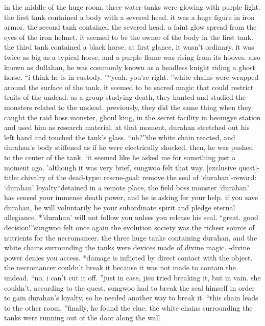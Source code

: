  in the middle of the huge room, three water tanks were glowing with purple light.
the first tank contained a body with a severed head.
 it was a huge figure in iron armor.
the second tank contained the severed head.
 a faint glow spread from the eyes of the iron helmet.
 it seemed to be the owner of the body in the first tank.
the third tank contained a black horse.
 at first glance, it wasn’t ordinary.
 it was twice as big as a typical horse, and a purple flame was rising from its hooves.
also known as dullahan, he was commonly known as a headless knight riding a ghost horse.
“i think he is in custody.
”“yeah, you’re right.
”white chains were wrapped around the surface of the tank.
 it seemed to be sacred magic that could restrict traits of the undead.
as a group studying death, they hunted and studied the monsters related to the undead.
 previously, they did the same thing when they caught the raid boss monster, ghoul king, in the secret facility in beomgye station and used him as research material.
at that moment, durahan stretched out his left hand and touched the tank’s glass.
“uh?”the white chain reacted, and durahan’s body stiffened as if he were electrically shocked.
 then, he was pushed to the center of the tank.
‘it seemed like he asked me for something just a moment ago.
’although it was very brief, sungwoo felt that way.
[exclusive quest]-title: chivalry of the dead-type: rescue-goal: remove the seal of ‘durahan’-reward: ‘durahan’ loyalty*detained in a remote place, the field boss monster ‘durahan’ has sensed your immense death power, and he is asking for your help.
 if you save durahan, he will voluntarily be your subordinate spirit and pledge eternal allegiance.
*’durahan’ will not follow you unless you release his seal.
“great.
 good decision!”sungwoo felt once again the evolution society was the richest source of nutrients for the necromancer.
the three huge tanks containing durahan, and the white chains surrounding the tanks were devices made of divine magic.
-divine power denies you access.
*damage is inflicted by direct contact with the object.
the necromancer couldn’t break it because it was not made to contain the undead.
“no, i can’t cut it off.
”just in case, jisu tried breaking it, but in vain.
 she couldn’t.
according to the quest, sungwoo had to break the seal himself in order to gain durahan’s loyalty, so he needed another way to break it.
“this chain leads to the other room.
”finally, he found the clue.
 the white chains surrounding the tanks were running out of the door along the wall.


